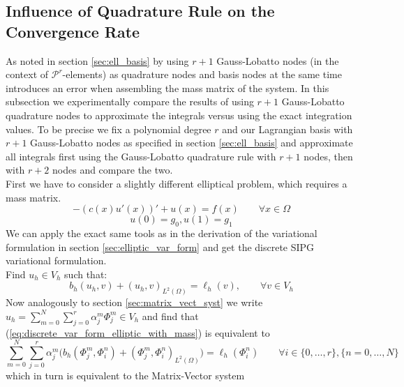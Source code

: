 \subsection{Influence of Quadrature Rule on the Convergence Rate}
As noted in section \ref{sec:ell_basis} by using $r+1$ Gauss-Lobatto nodes (in the context of $\mathcal{P}^r$-elements) as quadrature nodes and basis nodes at the same time
introduces an error when assembling the mass matrix of the system. In this subsection we experimentally compare the results of using $r+1$ Gauss-Lobatto quadrature nodes
to approximate the integrals versus using the exact integration values. To be precise we fix a polynomial degree $r$ and our Lagrangian basis with $r+1$ Gauss-Lobatto nodes
as specified in section \ref{sec:ell_basis} and approximate all integrals first using the Gauss-Lobatto quadrature rule with $r+1$ nodes, then with $r+2$ nodes and compare the two.
\\
First we have to consider a slightly different elliptical problem, which requires a mass matrix. 
\begin{equation}
	\label{eq:elliptic_pde_with:mass}
	-(c(x)u'(x))' + u(x) = f(x) \qquad \forall x\in \Omega \nonumber
\end{equation}
\begin{equation}
	\label{eq:elliptic_pde_bc_with_mass}
	u(0) = g_0, u(1) = g_1 \nonumber
\end{equation}
We can apply the exact same tools as in the derivation of the variational formulation in section \ref{sec:elliptic_var_form} and get the discrete SIPG variational formulation. \\
Find $u_h \in V_h$ such that:
\begin{equation}
	\label{eq:discrete_var_form_elliptic_with_mass}
	b_h(u_h, v) + (u_h, v)_{L^2(\Omega)} = \ell_h(v), \qquad \forall v\in V_h 
\end{equation}
Now analogously to section \ref{sec:matrix_vect_syst} we write $u_h = \sum_{m=0}^{N} \sum_{j=0}^r \alpha_j^m \Phi_j^m \in V_h$ and find that (\ref{eq:discrete_var_form_elliptic_with_mass})
is equivalent to \\
\begin{equation*}
	\sum_{m=0}^{N} \sum_{j=0}^r \alpha_j^m \Big(b_h(\Phi_j^m, \Phi_i^n) + (\Phi_j^m, \Phi_i^n)_{L^2(\Omega)}\Big) = \ell_h(\Phi_i^n) \qquad \forall i \in \{0,\ldots,r\}, \{n = 0,\ldots,N\}
\end{equation*}
which in turn is equivalent to the Matrix-Vector system

